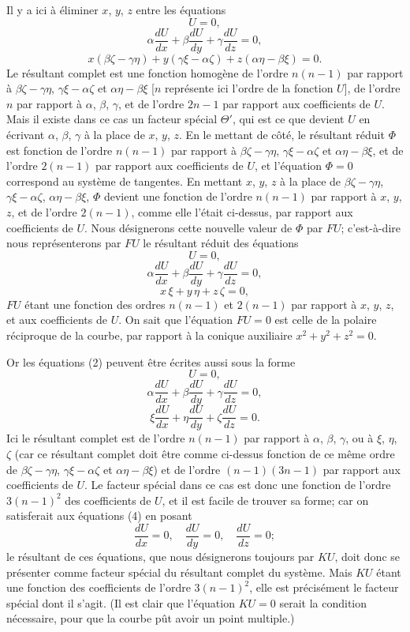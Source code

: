 \documentclass[11pt]{article}
\begin{document}
Il y a ici \`a \'eliminer $x$, $y$, $z$ entre les \'equations
\[
U = 0,
\]
\[
\alpha\frac{dU}{dx} + \beta\frac{dU}{dy} + \gamma\frac{dU}{dz} = 0,
\]
\[
x(\beta\zeta - \gamma\eta) + y(\gamma\xi - \alpha\zeta) + z(\alpha\eta - \beta\xi) = 0. \tag{2}
\]
Le r\'esultant complet est une fonction homog\`ene de l'ordre $n(n - 1)$ par rapport \`a
$\beta\zeta - \gamma\eta$, $\gamma\xi - \alpha\zeta$ et $\alpha\eta - \beta\xi$ [$n$ repr\'esente ici l'ordre de la fonction $U$], de l'ordre $n$
par rapport \`a $\alpha$, $\beta$, $\gamma$, et de l'ordre $2n - 1$ par rapport aux coefficients de $U$. Mais il
existe dans ce cas un facteur sp\'ecial $\Theta'$, qui est ce que devient $U$ en \'ecrivant $\alpha$, $\beta$, $\gamma$
\`a la place de $x$, $y$, $z$. En le mettant de c\^ot\'e, le r\'esultant r\'eduit $\Phi$ est fonction de
l'ordre $n(n - 1)$ par rapport \`a $\beta\zeta - \gamma\eta$, $\gamma\xi - \alpha\zeta$ et $\alpha\eta - \beta\xi$, et de l'ordre $2(n - 1)$ par
rapport aux coefficients de $U$, et l'\'equation $\Phi = 0$ correspond au syst\`eme de tangentes.
En mettant $x$, $y$, $z$ \`a la place de $\beta\zeta - \gamma\eta$, $\gamma\xi - \alpha\zeta$, $\alpha\eta - \beta\xi$, $\Phi$ devient une fonction
de l'ordre $n(n - 1)$ par rapport \`a $x$, $y$, $z$, et de l'ordre $2(n - 1)$, comme elle l'\'etait
ci-dessus, par rapport aux coefficients de $U$. Nous d\'esignerons cette nouvelle valeur de
$\Phi$ par $F U$; c'est-\`a-dire nous repr\'esenterons par $F U$ le r\'esultant r\'eduit des \'equations
\[
U = 0,
\]
\[
\alpha\frac{dU}{dx} + \beta\frac{dU}{dy} + \gamma\frac{dU}{dz} = 0,
\]
\[
x\,\xi + y\,\eta + z\,\zeta = 0, \tag{3}
\]
$F U$ \'etant une fonction des ordres $n(n - 1)$ et $2(n - 1)$ par rapport \`a $x$, $y$, $z$, et aux
coefficients de $U$. On sait que l'\'equation $F U = 0$ est celle de la polaire r\'eciproque de
la courbe, par rapport \`a la conique auxiliaire $x^{2} + y^{2} + z^{2} = 0$.

\medskip
Or les \'equations (2) peuvent \^etre \'ecrites aussi sous la forme
\[
U = 0,
\]
\[
\alpha\frac{dU}{dx} + \beta\frac{dU}{dy} + \gamma\frac{dU}{dz} = 0,
\]
\[
\xi\frac{dU}{dx} + \eta\frac{dU}{dy} + \zeta\frac{dU}{dz} = 0. \tag{4}
\]
Ici le r\'esultant complet est de l'ordre $n(n - 1)$ par rapport \`a $\alpha$, $\beta$, $\gamma$, ou \`a $\xi$, $\eta$, $\zeta$
(car ce r\'esultant complet doit \^etre comme ci-dessus fonction de ce m\^eme ordre de
$\beta\zeta - \gamma\eta$, $\gamma\xi - \alpha\zeta$ et $\alpha\eta - \beta\xi$) et de l'ordre $(n - 1)(3n - 1)$ par rapport aux coefficients
de $U$. Le facteur sp\'ecial dans ce cas est donc une fonction de l'ordre $3(n - 1)^{2}$ des
coefficients de $U$, et il est facile de trouver sa forme; car on satisferait aux \'equations
(4) en posant
\[
\frac{dU}{dx} = 0, \quad \frac{dU}{dy} = 0, \quad \frac{dU}{dz} = 0 \tag{5};
\]
le r\'esultant de ces \'equations, que nous d\'esignerons toujours par $K U$, doit donc
se pr\'esenter comme facteur sp\'ecial du r\'esultant complet du syst\`eme. Mais $K U$ \'etant
une fonction des coefficients de l'ordre $3(n - 1)^{2}$, elle est pr\'ecis\'ement le facteur sp\'ecial
dont il s'agit. (Il est clair que l'\'equation $K U = 0$ serait la condition n\'ecessaire, pour
que la courbe p\^ut avoir un point multiple.)
\end{document}
